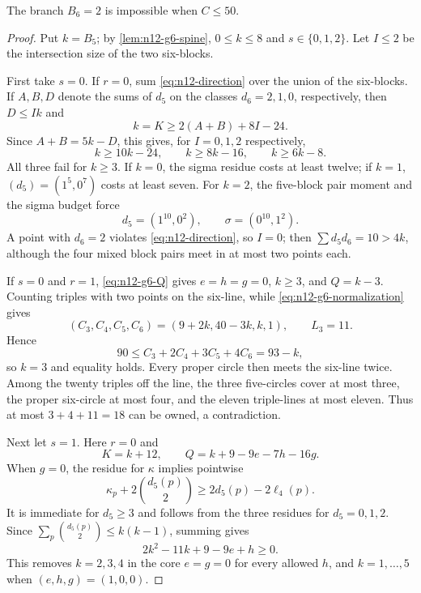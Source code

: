 \begin{lemma}\label{lem:n12-g6-m2}
The branch $B_6=2$ is impossible when $C\le50$.
\end{lemma}

\begin{proof}
Put $k=B_5$; by \cref{lem:n12-g6-spine}, $0\le k\le8$ and
$s\in\{0,1,2\}$.  Let $I\le2$ be the intersection size of the two
six-blocks.

First take $s=0$.  If $r=0$, sum \eqref{eq:n12-direction} over the union
of the six-blocks.  If $A,B,D$ denote the sums of $d_5$ on the classes
$d_6=2,1,0$, respectively, then $D\le Ik$ and
\[
 k=K\ge2(A+B)+8I-24.
\]
Since $A+B=5k-D$, this gives, for $I=0,1,2$ respectively,
\begin{equation}\label{eq:n12-m2-s0-three}
 k\ge10k-24,\qquad k\ge8k-16,\qquad k\ge6k-8.
\end{equation}
All three fail for $k\ge3$.  If $k=0$, the sigma residue costs at least
twelve; if $k=1$, $(d_5)=(1^5,0^7)$ costs at least seven.  For $k=2$, the
five-block pair moment and the sigma budget force
\[
 d_5=(1^{10},0^2),\qquad \sigma=(0^{10},1^2).
\]
A point with $d_6=2$ violates \eqref{eq:n12-direction}, so $I=0$; then
$\sum d_5d_6=10>4k$, although the four mixed block pairs meet in at most
two points each.

If $s=0$ and $r=1$, \eqref{eq:n12-g6-Q} gives
$e=h=g=0$, $k\ge3$, and $Q=k-3$.  Counting triples with two points on the
six-line, while \eqref{eq:n12-g6-normalization} gives
\[
(C_3,C_4,C_5,C_6)=(9+2k,40-3k,k,1),\qquad L_3=11.
\]
Hence
\[
90\le C_3+2C_4+3C_5+4C_6=93-k,
\]
so $k=3$ and equality holds.  Every proper circle then meets the six-line
twice.  Among the twenty triples off the line, the three five-circles
cover at most three, the proper six-circle at most four, and the eleven
triple-lines at most eleven.  Thus at most $3+4+11=18$ can be owned, a
contradiction.

Next let $s=1$.  Here $r=0$ and
\begin{equation}\label{eq:n12-m2-s1-spine}
 K=k+12,\qquad Q=k+9-9e-7h-16g.
\end{equation}
When $g=0$, the residue for $\kappa$ implies pointwise
\begin{equation}\label{eq:n12-m2-defect}
 \kappa_p+2\binom{d_5(p)}2\ge2d_5(p)-2\ell_4(p).
\end{equation}
It is immediate for $d_5\ge3$ and follows from the three residues for
$d_5=0,1,2$.  Since
$\sum_p\binom{d_5(p)}2\le k(k-1)$, summing gives
\begin{equation}\label{eq:n12-m2-scalar-defect}
 2k^2-11k+9-9e+h\ge0.
\end{equation}
This removes $k=2,3,4$ in the core $e=g=0$ for every allowed $h$, and
$k=1,\ldots,5$ when $(e,h,g)=(1,0,0)$.


\end{proof}
